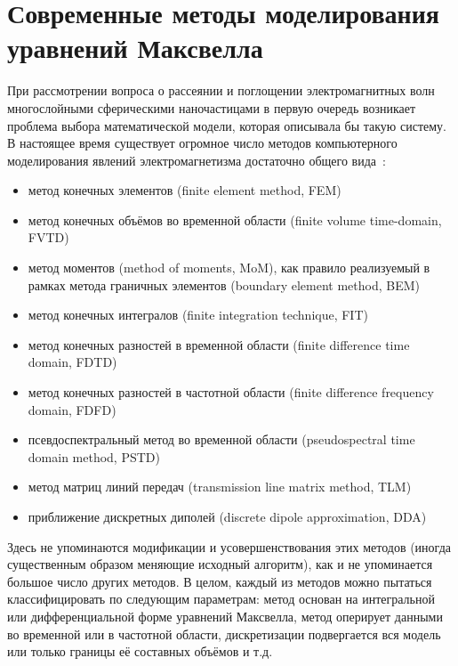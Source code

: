 \section{Современные методы моделирования уравнений Максвелла}
\label{sec:em-methods-intro}
При рассмотрении вопроса о рассеянии и поглощении электромагнитных
волн многослойными сферическими наночастицами в первую очередь
возникает проблема выбора математической модели, которая описывала бы
такую систему.  В настоящее время существует огромное число методов
компьютерного моделирования явлений электромагнетизма достаточно
общего
вида~\cite{Yu-PFDTD-2006,Inan-FDTD-2011,clemson,Bondenson-CEM-2005,Yu-Advanced-FDTD-2011}:
\begin{itemize}
\item метод конечных элементов (finite element method, FEM)
\item метод конечных объёмов во временной области (finite volume
  time-domain, FVTD)
\item метод моментов (method of moments, MoM), как правило реализуемый
  в рамках метода граничных элементов (boundary element method, BEM)
\item метод конечных интегралов (finite integration technique, FIT)
\item метод конечных разностей в временной области (finite difference
  time domain, FDTD)
\item метод конечных разностей в частотной области (finite difference
  frequency domain, FDFD)
\item псевдоспектральный метод во временной области (pseudospectral
  time domain method, PSTD)
\item метод матриц линий передач (transmission line matrix method,
  TLM)
\item приближение дискретных диполей (discrete dipole approximation, DDA)
\end{itemize}
Здесь не упоминаются модификации и усовершенствования этих методов
(иногда существенным образом меняющие исходный алгоритм), как и не
упоминается большое число других методов.  В целом, каждый из методов
можно пытаться классифицировать по следующим параметрам: метод основан
на интегральной или дифференциальной форме уравнений Максвелла, метод
оперирует данными во временной или в частотной области, дискретизации
подвергается вся модель или только границы её составных объёмов и т.д.

